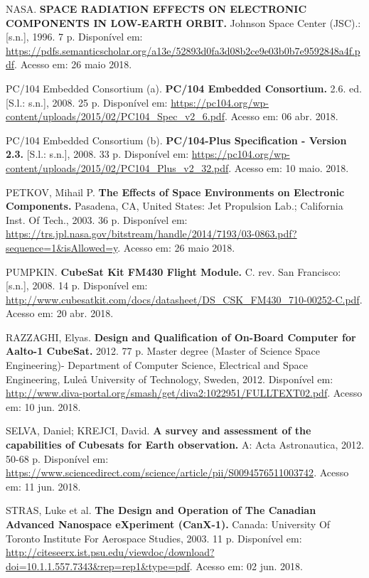 \noindent NASA. \textbf{SPACE RADIATION EFFECTS ON ELECTRONIC COMPONENTS IN LOW-EARTH ORBIT. } Johnson Space Center (JSC).: [s.n.], 1996. 7 p. Disponível em: \url{https://pdfs.semanticscholar.org/a13e/52893d0fa3d08b2ce9e03b0b7e9592848a4f.pdf}. Acesso em: 26 maio 2018.

\noindent PC/104 Embedded Consortium (a). \textbf{PC/104 Embedded Consortium. }2.6. ed. [S.l.: s.n.], 2008. 25 p. Disponível em: \url{https://pc104.org/wp-content/uploads/2015/02/PC104_Spec_v2_6.pdf}. Acesso em: 06 abr. 2018.

\noindent PC/104 Embedded Consortium (b). \textbf{PC/104-Plus Specification - Version 2.3. } [S.l.: s.n.], 2008. 33 p. Disponível em: \url{https://pc104.org/wp-content/uploads/2015/02/PC104_Plus_v2_32.pdf}. Acesso em: 10 maio. 2018.

\noindent PETKOV, Mihail P. \textbf{The Effects of Space Environments on Electronic Components. } Pasadena, CA, United States: Jet Propulsion Lab.; California Inst. Of Tech., 2003. 36 p. Disponível em: \url{https://trs.jpl.nasa.gov/bitstream/handle/2014/7193/03-0863.pdf?sequence=1&isAllowed=y}. Acesso em: 26 maio 2018.

\noindent PUMPKIN. \textbf{CubeSat Kit FM430 Flight Module.} C. rev. San Francisco: [s.n.], 2008. 14 p. Disponível em: \url{http://www.cubesatkit.com/docs/datasheet/DS_CSK_FM430_710-00252-C.pdf}. Acesso em: 20 abr. 2018.

\noindent RAZZAGHI, Elyas. \textbf{Design and Qualification of On-Board Computer for Aalto-1 CubeSat.} 2012. 77 p. Master degree (Master of Science Space Engineering)- Department of Computer Science, Electrical and Space Engineering, Luleå University of Technology, Sweden, 2012. Disponível em: \url{http://www.diva-portal.org/smash/get/diva2:1022951/FULLTEXT02.pdf}. Acesso em: 10 jun. 2018.

\noindent SELVA, Daniel; KREJCI, David. \textbf{A survey and assessment of the capabilities of Cubesats for Earth observation. } A: Acta Astronautica, 2012. 50-68 p. Disponível em: \url{https://www.sciencedirect.com/science/article/pii/S0094576511003742}. Acesso em: 11 jun. 2018.

\noindent STRAS, Luke et al. \textbf{The Design and Operation of The Canadian Advanced Nanospace eXperiment (CanX-1). } Canada: University Of Toronto Institute For Aerospace Studies, 2003. 11 p. Disponível em: \url{http://citeseerx.ist.psu.edu/viewdoc/download?doi=10.1.1.557.7343\&rep=rep1\&type=pdf}. Acesso em: 02 jun. 2018.

